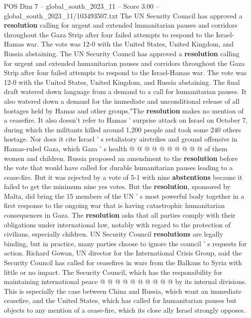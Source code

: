 \begin{textsample}{POS Dim 7 – global\_south\_2023\_11 – Score 3.00 – global\_south\_2023\_11/103493507.txt}  \label{ex:f7_pos_124}
The UN Security Council has approved a \textbf{resolution} calling for urgent and extended humanitarian pauses and corridors throughout the Gaza Strip after four failed attempts to respond to the Israel-Hamas war.
The vote was 12-0 with the United States, United Kingdom, and Russia abstaining.
The UN Security Council has approved a \textbf{resolution} calling for urgent and extended humanitarian pauses and corridors throughout the Gaza Strip after four failed attempts to respond to the Israel-Hamas war.
The vote was 12-0 with the United States, United Kingdom, and Russia abstaining.
The final draft watered down language from a demand to a call for humanitarian pauses.
It also watered down a demand for the immediate and unconditional release of all hostages held by Hamas and other groups."The \textbf{resolution} makes no mention of a ceasefire.
It also doesn't refer to Hamas ' surprise attack on Israel on October 7, during which the militants killed around 1,200 people and took some 240 others hostage.
Nor does it cite Israel ' s retaliatory airstrikes and ground offensive in Hamas-ruled Gaza, which Gaza ' s health @ @ @ @ @ @ @ @ @ @ of them women and children.
Russia proposed an amendment to the \textbf{resolution} before the vote that would have called for durable humanitarian pauses leading to a cease-fire.
But it was rejected by a vote of 5-1 with nine \textbf{abstentions} because it failed to get the minimum nine yes votes.
But the \textbf{resolution}, sponsored by Malta, did bring the 15 members of the UN ' s most powerful body together in a first response to the ongoing war that is having catastrophic humanitarian consequences in Gaza.
The \textbf{resolution} asks that all parties comply with their obligations under international law, notably with regard to the protection of civilians, especially children.
UN Security Council \textbf{resolutions} are legally binding, but in practice, many parties choose to ignore the council ' s requests for action.
Richard Gowan, UN director for the International Crisis Group, said the Security Council has called for ceasefires in wars from the Balkans to Syria with little or no impact.
The Security Council, which has the responsibility for maintaining international peace @ @ @ @ @ @ @ @ @ @ by its internal divisions.
This is especially the case between China and Russia, which want an immediate ceasefire, and the United States, which has called for humanitarian pauses but objects to any mention of a cease-fire, which its close ally Israel strongly opposes.

\end{textsample}
